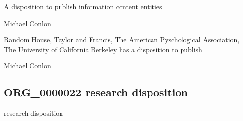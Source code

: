 \documentclass[letterpaper,10pt,english]{sphinxmanual}
\begin{document}
\begin{sphinxShadowBox}

\sphinxAtStartPar
A disposition to publish information content entities
\end{sphinxShadowBox}

\begin{sphinxShadowBox}

\sphinxAtStartPar
Michael Conlon 
\end{sphinxShadowBox}

\begin{sphinxShadowBox}

\sphinxAtStartPar
Random House, Taylor and Francis, The American Pyschological Association, The University of California Berkeley has a disposition to publish
\end{sphinxShadowBox}

\begin{sphinxShadowBox}

\sphinxAtStartPar
{}
\end{sphinxShadowBox}

\begin{sphinxShadowBox}

\sphinxAtStartPar
Michael Conlon 
\end{sphinxShadowBox}
\begin{quote}

\ignorespaces \end{quote}


\subsection{ORG\_0000022 \sphinxhyphen{} research disposition}
\label{\detokenize{doc-ORG_0000022:org-0000022-research-disposition}}\label{\detokenize{doc-ORG_0000022:index-0}}\label{\detokenize{doc-ORG_0000022::doc}}
\begin{sphinxShadowBox}

\sphinxAtStartPar
research disposition
\end{sphinxShadowBox}
\end{document}
